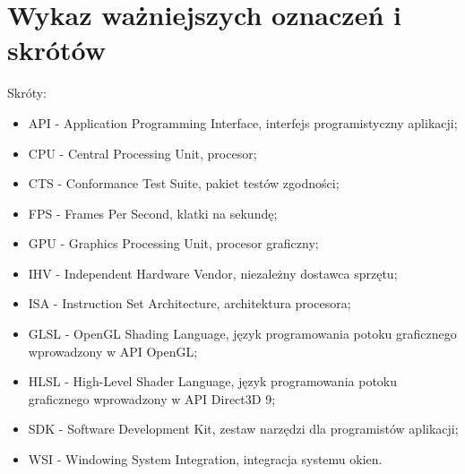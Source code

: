 \chapter*{Wykaz ważniejszych oznaczeń i skrótów}

Skróty:
\begin{itemize}
\item{API} - Application Programming Interface, interfejs programistyczny aplikacji;
\item{CPU} - Central Processing Unit, procesor;
\item{CTS} - Conformance Test Suite, pakiet testów zgodności;
\item{FPS} - Frames Per Second, klatki na sekundę;
\item{GPU} - Graphics Processing Unit, procesor graficzny;
\item{IHV} - Independent Hardware Vendor, niezależny dostawca sprzętu;
\item{ISA} - Instruction Set Architecture, architektura procesora;
\item{GLSL} - OpenGL Shading Language, język programowania potoku graficznego wprowadzony w API OpenGL;
\item{HLSL} - High-Level Shader Language, język programowania potoku graficznego wprowadzony w API Direct3D 9;
\item{SDK} - Software Development Kit, zestaw narzędzi dla programistów aplikacji;
\item{WSI} -  Windowing System Integration, integracja systemu okien.
\end{itemize}